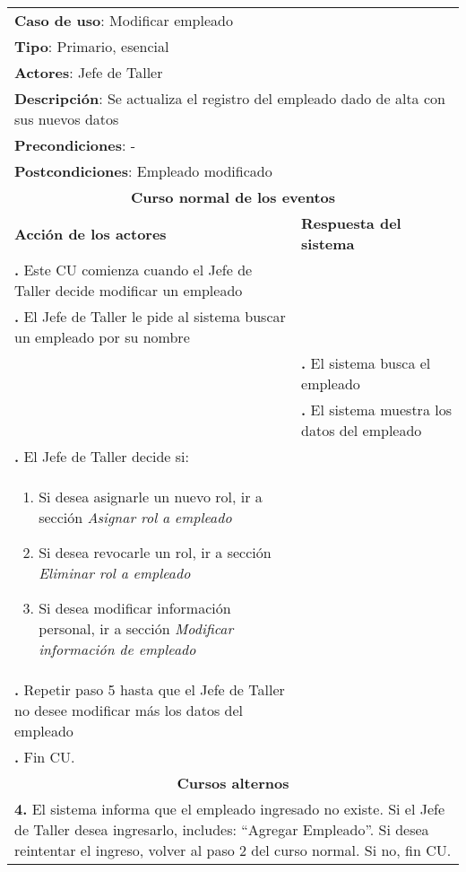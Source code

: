 \documentclass[12pt]{extarticle}
\newcounter{step}
\newcommand\inc{\stepcounter{step}\textbf{\thestep. }}
\begin{document}
	\begin{longtable}{ |p{8cm}|p{8cm}| }
		\hline
		\multicolumn{2}{|p{16cm}|}{\textbf{Caso de uso}: Modificar empleado}\\
		\multicolumn{2}{|p{16cm}|}{\textbf{Tipo}: Primario, esencial}\\
		\multicolumn{2}{|p{16cm}|}{\textbf{Actores}: Jefe de Taller}\\
		\multicolumn{2}{|p{16cm}|}{\textbf{Descripción}: Se actualiza el registro del empleado dado de alta con sus nuevos datos}\\
		\multicolumn{2}{|p{16cm}|}{\textbf{Precondiciones}: -}\\
		\multicolumn{2}{|p{16cm}|}{\textbf{Postcondiciones}: Empleado modificado}\\
		\hline
		\multicolumn{2}{|c|}{\textbf{Curso normal de los eventos}}\\
		\hline
		\textbf{Acción de los actores} & \textbf{Respuesta del sistema}\\
		\hline
			\inc Este CU comienza cuando el Jefe de Taller decide modificar un empleado& \\
			\hline
			\inc El Jefe de Taller le pide al sistema buscar un empleado por su nombre & \\
			\hline
		    & \inc El sistema busca el empleado \\
			\hline
		    & \inc El sistema muestra los datos del empleado \\
			\hline
			\inc El Jefe de Taller decide si: &  \\
                \begin{enumerate}[label=(\alph*)]
                    \item Si desea asignarle un nuevo rol, ir a sección \textit{Asignar rol a empleado}
                    \item Si desea revocarle un rol, ir a sección \textit{Eliminar rol a empleado}
                    \item Si desea modificar información personal, ir a sección \textit{Modificar información de empleado}
                \end{enumerate}        & \\
			\hline
			\inc Repetir paso 5 hasta que el Jefe de Taller no desee modificar más los datos del empleado &\\
			\hline
			\inc Fin CU. & \\
		\hline
		\multicolumn{2}{|c|}{\textbf{Cursos alternos}}\\
		\hline
		\multicolumn{2}{|p{16cm}|}{\textbf{4. }El sistema informa que el empleado ingresado no existe. Si el Jefe de Taller desea ingresarlo, includes: ``Agregar Empleado''. Si desea reintentar el ingreso, volver al paso 2 del curso normal. Si no, fin CU.}\\
		\hline
	\end{longtable}
\end{document}
